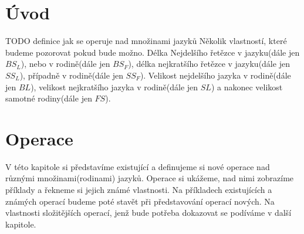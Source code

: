 
\newcommand\tab[1][1cm]{\hspace*{#1}}

\chapter{Úvod}
TODO definice jak se operuje nad množinami jazyků
Několik vlastností, které budeme pozorovat pokud bude možno. Délka Nejdelšího řetězce v jazyku(dále jen $BS_{L}$), nebo v rodině(dále jen $BS_{F}$), délka nejkratšího řetězce v jazyku(dále jen $SS_{L}$), případně v rodině(dále jen $SS_{F}$).
Velikost nejdelšího jazyka v rodině(dále jen $BL$), velikost nejkratšího jazyka v rodině(dále jen $SL$) a nakonec velikost samotné rodiny(dále jen $FS$).

\chapter{Operace} \label{chap:Operace}
V této kapitole si představíme existující a definujeme si nové operace nad různými množinami(rodinami) jazyků.
Operace si ukážeme, nad nimi zobrazíme příklady a řekneme si jejich známé vlastnosti. Na příkladech existujících a známých operací budeme poté stavět při představování operací nových. Na vlastnosti složitějších operací, jenž bude potřeba dokazovat se podíváme v další kapitole.







%







%

%












